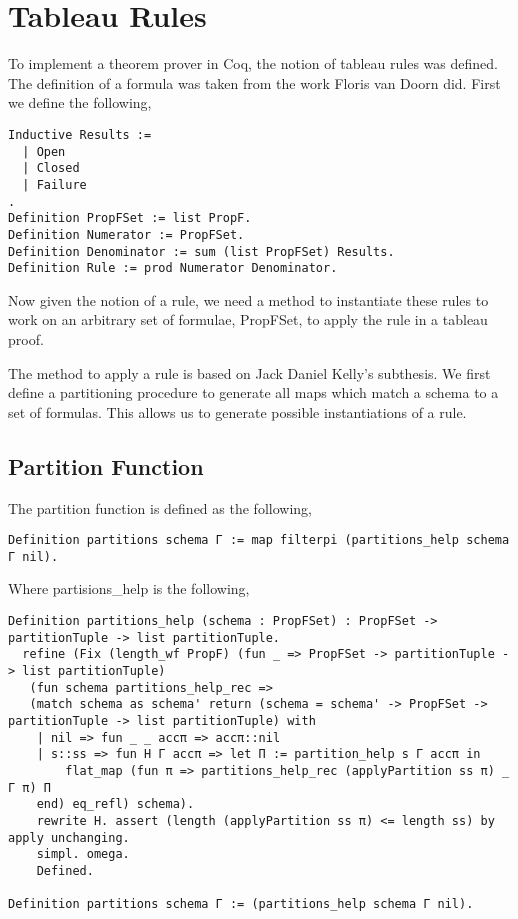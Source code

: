 \documentclass{report}
\begin{document}
\section{Tableau Rules}

To implement a theorem prover in Coq, the notion of tableau rules was defined.
The definition of a formula was taken from the work Floris van Doorn did.
First we define the following,

\begin{lstlisting}
Inductive Results :=
  | Open
  | Closed
  | Failure
.
Definition PropFSet := list PropF.
Definition Numerator := PropFSet.
Definition Denominator := sum (list PropFSet) Results.
Definition Rule := prod Numerator Denominator.
\end{lstlisting}

Now given the notion of a rule, we need a method to instantiate these rules to
work on an arbitrary set of formulae, PropFSet, to apply the rule in a tableau
proof.

\par

The method to apply a rule is based on Jack Daniel Kelly's subthesis. We first
define a partitioning procedure to generate all maps which match a schema to
a set of formulas. This allows us to generate possible instantiations of a
rule.

\subsection{Partition Function}

The partition function is defined as the following,

\begin{lstlisting}
Definition partitions schema Γ := map filterpi (partitions_help schema Γ nil).
\end{lstlisting}

Where partisions\_help is the following,

\begin{lstlisting}
Definition partitions_help (schema : PropFSet) : PropFSet -> partitionTuple -> list partitionTuple.
  refine (Fix (length_wf PropF) (fun _ => PropFSet -> partitionTuple -> list partitionTuple)
   (fun schema partitions_help_rec =>
   (match schema as schema' return (schema = schema' -> PropFSet -> partitionTuple -> list partitionTuple) with
    | nil => fun _ _ accπ => accπ::nil
    | s::ss => fun H Γ accπ => let Π := partition_help s Γ accπ in
        flat_map (fun π => partitions_help_rec (applyPartition ss π) _ Γ π) Π
    end) eq_refl) schema).
    rewrite H. assert (length (applyPartition ss π) <= length ss) by apply unchanging.
    simpl. omega.
    Defined.

Definition partitions schema Γ := (partitions_help schema Γ nil).
\end{lstlisting}
\end{document}

